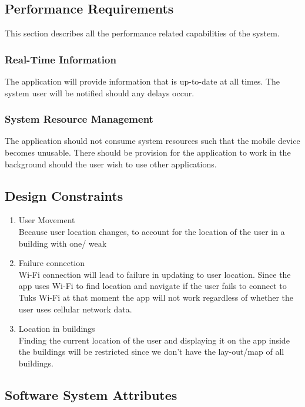 \documentclass[a4paper,10pt]{article}
\begin{document}
	\subsection{Performance Requirements}
   This section describes all the performance related capabilities of the system.
               \subsubsection{Real-Time Information}
  The application will provide information that is up-to-date at all times. The system user will be notified should any delays occur. 
               \subsubsection{System Resource Management}
   The application should not consume system resources such that the mobile device becomes unusable. There should be provision for the application to work in the background should the user wish to use other applications.
   
	\subsection{Design Constraints}
		\begin{enumerate}
		\item 	User Movement \\
Because user location changes, to account for the location of the user in a building with one/ weak 
			
		\item 	Failure connection \\
Wi-Fi connection will lead to failure in updating to user location. Since the app uses Wi-Fi to find location and navigate if the user fails to connect to Tuks Wi-Fi at that moment the app will not work regardless of whether the user uses cellular network data.	
					
		\item Location in buildings \\
Finding the current location of the user and displaying it on the app inside the buildings will be restricted since we don't have the lay-out/map of all buildings.	
		\end{enumerate}				

	\subsection{Software System Attributes}
\end{document}
